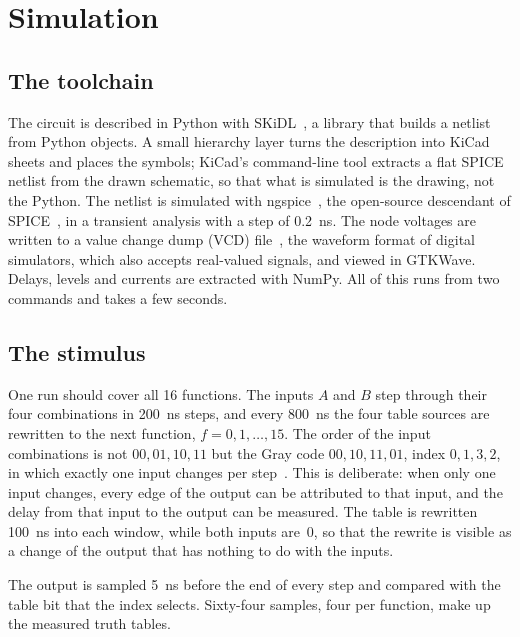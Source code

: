 \documentclass[11pt,a4paper]{article}
\begin{document}
\section{Simulation}
\label{sec:simulation}

\subsection{The toolchain}

The circuit is described in Python with SKiDL~\cite{SKiDL}, a library
that builds a netlist from Python objects. A small hierarchy layer
turns the description into KiCad sheets and places the symbols;
KiCad's command-line tool extracts a flat SPICE netlist from the drawn
schematic, so that what is simulated is the drawing, not the Python.
The netlist is simulated with ngspice~\cite{ngspice}, the open-source
descendant of SPICE~\cite{Nagel1973}, in a transient analysis with a
step of \SI{0.2}{ns}. The node voltages are written to a value change
dump (VCD) file~\cite{IEEE1364}, the waveform format of digital
simulators, which also accepts real-valued signals, and viewed in
GTKWave. Delays, levels and currents are extracted with NumPy. All of
this runs from two commands and takes a few seconds.

\subsection{The stimulus}

One run should cover all 16 functions. The inputs $A$ and $B$ step
through their four combinations in \SI{200}{ns} steps, and every
\SI{800}{ns} the four table sources are rewritten to the next
function, $f=0,1,\ldots,15$. The order of the input combinations is
not $00,01,10,11$ but the Gray code $00,10,11,01$, index $0,1,3,2$, in
which exactly one input changes per step~\cite{Gray1953}. This is
deliberate: when only one input changes, every edge of the output can
be attributed to that input, and the delay from that input to the
output can be measured. The table is rewritten \SI{100}{ns} into each
window, while both inputs are~0, so that the rewrite is visible as a
change of the output that has nothing to do with the inputs.

The output is sampled \SI{5}{ns} before the end of every step and
compared with the table bit that the index selects. Sixty-four samples,
four per function, make up the measured truth tables.
\end{document}
